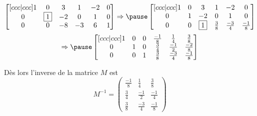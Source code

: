 \begin{frame}
  \begin{equation*}
    \begin{bmatrix}[ccc|ccc]
      1        & 0        & 3        & 1            & -2           & 0            \\
      0        & \fbox{1} & -2       & 0            & 1            & 0            \\
      0 & 0 & -8 & -3 & 6 & 1
    \end{bmatrix}\Rightarrow\pause
    \begin{bmatrix}[ccc|ccc]
      1        & 0        & 3        & 1            & -2           & 0            \\
      0        & 1        & -2       & 0            & 1            & 0            \\
      0 & 0 & \fbox{1} & \frac{3}{8} & \frac{-3}{4} & \frac{-1}{8}
    \end{bmatrix}
  \end{equation*}
  \begin{equation*}
    \Rightarrow\pause
    \begin{bmatrix}[ccc|ccc]
      1        & 0        & 0        & \frac{-1}{8} & \frac{1}{4}  & \frac{3}{8}  \\
      0        & 1        & 0        & \frac{3}{4}  & \frac{-1}{2} & \frac{-2}{8} \\
      0 & 0 & 1 & \frac{3}{8} & \frac{-3}{4} & \frac{-1}{8}
    \end{bmatrix}
  \end{equation*}\pause{}

  Dès lors l'inverse de la matrice \(M\) est
  \begin{equation*}
    M^{-1} =
    \begin{pmatrix}
      \frac{-1}{8} & \frac{1}{4}  & \frac{3}{8}  \\
      \frac{3}{4}  & \frac{-1}{2} & \frac{-1}{4} \\
      \frac{3}{8} & \frac{-3}{4} & \frac{-1}{8}
    \end{pmatrix}
  \end{equation*}
\end{frame}

